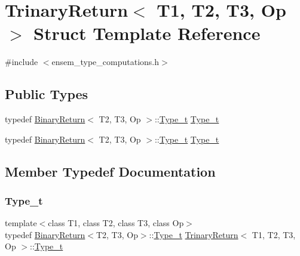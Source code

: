 \hypertarget{structTrinaryReturn}{}\section{Trinary\+Return$<$ T1, T2, T3, Op $>$ Struct Template Reference}
\label{structTrinaryReturn}


{\ttfamily \#include $<$ensem\+\_\+type\+\_\+computations.\+h$>$}

\subsection*{Public Types}
\begin{DoxyCompactItemize}
\item 
typedef \mbox{\hyperlink{structBinaryReturn}{Binary\+Return}}$<$ T2, T3, Op $>$\+::\mbox{\hyperlink{structTrinaryReturn_ac67f5482a7fd12139d0cc6b5ec1cc374}{Type\+\_\+t}} \mbox{\hyperlink{structTrinaryReturn_ac67f5482a7fd12139d0cc6b5ec1cc374}{Type\+\_\+t}}
\item 
typedef \mbox{\hyperlink{structBinaryReturn}{Binary\+Return}}$<$ T2, T3, Op $>$\+::\mbox{\hyperlink{structTrinaryReturn_ac67f5482a7fd12139d0cc6b5ec1cc374}{Type\+\_\+t}} \mbox{\hyperlink{structTrinaryReturn_ac67f5482a7fd12139d0cc6b5ec1cc374}{Type\+\_\+t}}
\end{DoxyCompactItemize}


\subsection{Member Typedef Documentation}
\mbox{\label{structTrinaryReturn_ac67f5482a7fd12139d0cc6b5ec1cc374}} 
\subsubsection{\texorpdfstring{Type\_t}{Type\_t}\hspace{0.1cm}{\footnotesize\ttfamily [1/2]}}
{\footnotesize\ttfamily template$<$class T1, class T2, class T3, class Op$>$ \\
typedef \mbox{\hyperlink{structBinaryReturn}{Binary\+Return}}$<$T2, T3, Op$>$\+::\mbox{\hyperlink{structTrinaryReturn_ac67f5482a7fd12139d0cc6b5ec1cc374}{Type\+\_\+t}} \mbox{\hyperlink{structTrinaryReturn}{Trinary\+Return}}$<$ T1, T2, T3, Op $>$\+::\mbox{\hyperlink{structTrinaryReturn_ac67f5482a7fd12139d0cc6b5ec1cc374}{Type\+\_\+t}}}

